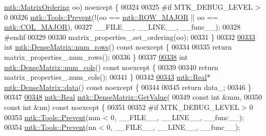 \begin{DoxyCode}
      \hyperlink{group__c02-enums_ga622801bd9f912d0f976c3e383f5f581c}{mtk::MatrixOrdering} oo) noexcept \{
00324 
00325 \textcolor{preprocessor}{  #if MTK\_DEBUG\_LEVEL > 0}
00326   \hyperlink{classmtk_1_1Tools_a332324c6f25e66be9dff48c5987a3b9f}{mtk::Tools::Prevent}(!(oo == \hyperlink{namespacemtk_ga622801bd9f912d0f976c3e383f5f581cabc55178ac16eb1ce89b5f3ab915a91f3}{mtk::ROW\_MAJOR} || oo == 
      \hyperlink{namespacemtk_ga622801bd9f912d0f976c3e383f5f581ca7c11989c132253fb76b8f6b1314f7e13}{mtk::COL\_MAJOR}),
00327                       \_\_FILE\_\_, \_\_LINE\_\_, \_\_func\_\_);
00328 \textcolor{preprocessor}{  #endif}
00329 
00330   matrix\_properties\_.set\_ordering(oo);
00331 \}
00332 
\hypertarget{mtk__dense__matrix_8cc_source_l00333}{}\hyperlink{classmtk_1_1DenseMatrix_a53f3afb3b6a8d21854458aaa9663cc74}{00333} \textcolor{keywordtype}{int} \hyperlink{classmtk_1_1DenseMatrix_a53f3afb3b6a8d21854458aaa9663cc74}{mtk::DenseMatrix::num\_rows}() const noexcept \{
00334 
00335   \textcolor{keywordflow}{return} matrix\_properties\_.num\_rows();
00336 \}
00337 
\hypertarget{mtk__dense__matrix_8cc_source_l00338}{}\hyperlink{classmtk_1_1DenseMatrix_a41747502d468c6728a4be31501b16e0e}{00338} \textcolor{keywordtype}{int} \hyperlink{classmtk_1_1DenseMatrix_a41747502d468c6728a4be31501b16e0e}{mtk::DenseMatrix::num\_cols}() const noexcept \{
00339 
00340   \textcolor{keywordflow}{return} matrix\_properties\_.num\_cols();
00341 \}
00342 
\hypertarget{mtk__dense__matrix_8cc_source_l00343}{}\hyperlink{classmtk_1_1DenseMatrix_a0c33b8a9e01d157c61ddbdf807c25d84}{00343} \hyperlink{group__c01-roots_gac080bbbf5cbb5502c9f00405f894857d}{mtk::Real}* \hyperlink{classmtk_1_1DenseMatrix_a0c33b8a9e01d157c61ddbdf807c25d84}{mtk::DenseMatrix::data}() const noexcept \{
00344 
00345   \textcolor{keywordflow}{return} data\_;
00346 \}
00347 
\hypertarget{mtk__dense__matrix_8cc_source_l00348}{}\hyperlink{classmtk_1_1DenseMatrix_a4b23ecbebd970b5eea915dbb50691024}{00348} \hyperlink{group__c01-roots_gac080bbbf5cbb5502c9f00405f894857d}{mtk::Real} \hyperlink{classmtk_1_1DenseMatrix_a4b23ecbebd970b5eea915dbb50691024}{mtk::DenseMatrix::GetValue}(
00349     \textcolor{keyword}{const} \textcolor{keywordtype}{int} &mm,
00350     \textcolor{keyword}{const} \textcolor{keywordtype}{int} &nn) \textcolor{keyword}{const} noexcept \{
00351 
00352 \textcolor{preprocessor}{  #if MTK\_DEBUG\_LEVEL > 0}
00353   \hyperlink{classmtk_1_1Tools_a332324c6f25e66be9dff48c5987a3b9f}{mtk::Tools::Prevent}(mm < 0, \_\_FILE\_\_, \_\_LINE\_\_, \_\_func\_\_);
00354   \hyperlink{classmtk_1_1Tools_a332324c6f25e66be9dff48c5987a3b9f}{mtk::Tools::Prevent}(nn < 0, \_\_FILE\_\_, \_\_LINE\_\_, \_\_func\_\_);

\end{DoxyCode}
